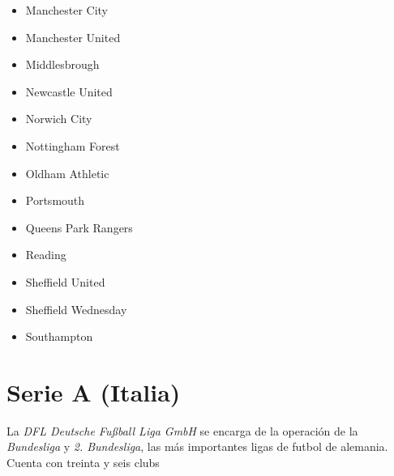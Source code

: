 \begin{multicols}{2}
\begin{itemize}
		\item Manchester City

		\item Manchester United

		\item Middlesbrough

		\item Newcastle United

		\item Norwich City

		\item Nottingham Forest

		\item Oldham Athletic

		\item Portsmouth

		\item Queens Park Rangers

		\item Reading

		\item Sheffield United

		\item Sheffield Wednesday

		\item Southampton
		
	\end{itemize}
\end{multicols}


\section{Serie A (Italia)}

La \emph{DFL Deutsche Fußball Liga GmbH} se encarga de la operación de la \emph{Bundesliga} y \emph{2. Bundesliga}, las más importantes ligas de futbol de alemania. Cuenta con treinta y seis clubs 



